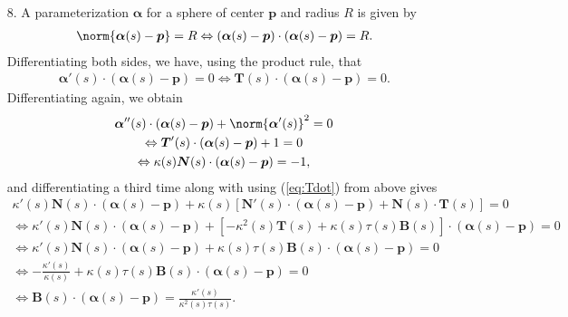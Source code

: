 \documentclass[a4paper,12pt]{article}
\newcommand{\bs}{\boldsymbol}
\theoremstyle{remark}
\begin{document}
\begin{enumerate}
    \item[8.]
        A parameterization $\bs{\alpha}$ for a sphere of center $\bs{p}$ and radius $R$ is given by
        \begin{align*}
            \norm{\bs{\alpha}(s) - \bs{p}} = R \Leftrightarrow (\bs{\alpha}(s) - \bs{p}) \cdot (\bs{\alpha}(s) - \bs{p}) = R.
        \end{align*}
        Differentiating both sides, we have, using the product rule, that
        \begin{align}
            \bs{\alpha}'(s) \cdot (\bs{\alpha}(s) - \bs{p}) = 0 \Leftrightarrow \bs{T}(s) \cdot (\bs{\alpha}(s) - \bs{p}) = 0. \label{eq:Tdot}
        \end{align}
        Differentiating again, we obtain
        \begin{gather}
            \bs{\alpha}''(s) \cdot (\bs{\alpha}(s) - \bs{p}) + \norm{\bs{\alpha}'(s)}^2 = 0 \nonumber \\
            \Leftrightarrow \bs{T}'(s) \cdot (\bs{\alpha}(s) - \bs{p}) + 1 = 0 \nonumber \\
            \Leftrightarrow \kappa(s) \bs{N}(s) \cdot (\bs{\alpha}(s) - \bs{p}) = -1, \label{eq:Ndot}
        \end{gather}
        and differentiating a third time along with using (\ref{eq:Tdot}) from above gives
        \begin{gather}
            \kappa'(s)\bs{N}(s) \cdot (\bs{\alpha}(s) - \bs{p}) + \kappa(s)[\bs{N}'(s) \cdot (\bs{\alpha}(s) - \bs{p}) + \bs{N}(s) \cdot \bs{T}(s)] = 0 \nonumber \\
            \Leftrightarrow \kappa'(s)\bs{N}(s) \cdot (\bs{\alpha}(s) - \bs{p}) + [-\kappa^2(s)\bs{T}(s) + \kappa(s)\tau(s)\bs{B}(s)] \cdot (\bs{\alpha}(s) - \bs{p}) = 0 \nonumber \\
            \Leftrightarrow \kappa'(s)\bs{N}(s) \cdot (\bs{\alpha}(s) - \bs{p}) + \kappa(s)\tau(s)\bs{B}(s) \cdot (\bs{\alpha}(s) - \bs{p}) = 0 \nonumber \\
            \Leftrightarrow -\frac{\kappa'(s)}{\kappa(s)} + \kappa(s)\tau(s)\bs{B}(s) \cdot (\bs{\alpha}(s) - \bs{p}) = 0 \nonumber \\
            \Leftrightarrow \bs{B}(s) \cdot (\bs{\alpha}(s) - \bs{p}) = \frac{\kappa'(s)}{\kappa^2(s)\tau(s)}. \label{eq:Bdot}

\end{gather}
\end{enumerate}
\end{document}
